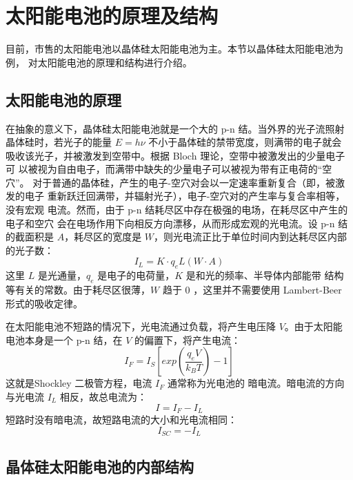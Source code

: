 \section{太阳能电池的原理及结构}

目前，市售的太阳能电池以晶体硅太阳能电池为主。本节以晶体硅太阳能电池为例，
对太阳能电池的原理和结构进行介绍。

\subsection{太阳能电池的原理}

在抽象的意义下，晶体硅太阳能电池就是一个大的 p-n 结。当外界的光子流照射
晶体硅时，若光子的能量 $E = h\nu$ 不小于晶体硅的禁带宽度，则满带的电子就会
吸收该光子，并被激发到空带中。根据 Bloch 理论，空带中被激发出的少量电子可
以被视为自由电子，而满带中缺失的少量电子可以被视为带有正电荷的“空穴”。
对于普通的晶体硅，产生的电子-空穴对会以一定速率重新复合（即，被激发的电子
重新跃迁回满带，并辐射光子），电子-空穴对的产生率与复合率相等，没有宏观
电流。然而，由于 p-n 结耗尽区中存在极强的电场，在耗尽区中产生的电子和空穴
会在电场作用下向相反方向漂移，从而形成宏观的光电流。设 p-n 结的截面积是
$A$，耗尽区的宽度是 $W$，则光电流正比于单位时间内到达耗尽区内部的光子数：
\begin{equation} \label{eqn:LightCurrent}
I_L = K \cdot q_e L(W \cdot A)
\end{equation}
这里 $L$ 是光通量，$q_e$ 是电子的电荷量，$K$ 是和光的频率、半导体内部能带
结构等有关的常数。由于耗尽区很薄，$W$ 趋于 $0$ ，这里并不需要使用
Lambert-Beer 形式的吸收定律。

在太阳能电池不短路的情况下，光电流通过负载，将产生电压降 $V$。由于太阳能
电池本身是一个 p-n 结，在 $V$ 的偏置下，将产生电流：
\begin{equation} \label{eqn:Shockley}
I_F = I_S \left[ exp \left(\frac{q_e V}{k_B T} \right) - 1 \right]
\end{equation}
这就是Shockley 二极管方程，电流 $I_F$ 通常称为光电池的
暗电流。暗电流的方向与光电流 $I_L$ 相反，故总电流为：
\begin{equation} \label{eqn:TotalCurrent}
I = I_F - I_L
\end{equation}
短路时没有暗电流，故短路电流的大小和光电流相同：
\begin{equation} \label{eqn:SCCurrent}
I_{SC} = -I_L
\end{equation}

\subsection{晶体硅太阳能电池的内部结构}

